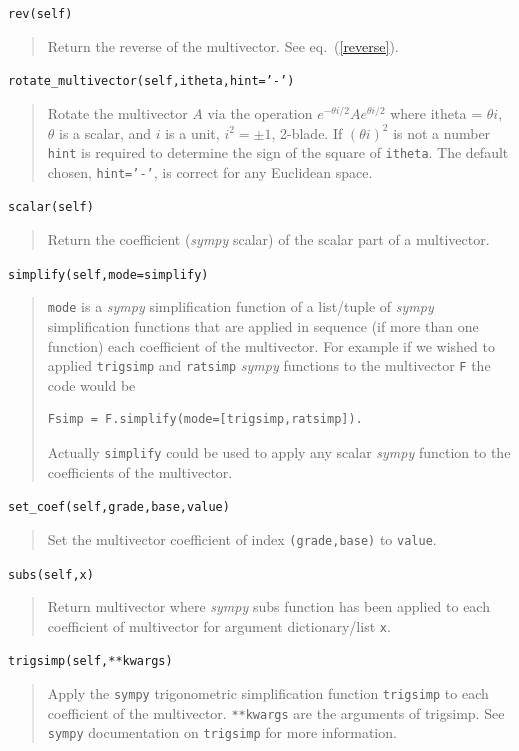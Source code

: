 \documentclass[12pt]{report}
\newcommand{\lp}{\left (}
\newcommand{\rp}{\right )}
\newcommand{\paren}[1]{\lp {#1} \rp}
\newcommand{\T}[1]{\texttt{#1}}
\begin{document}
\T{rev(self)}
\begin{quote}
   Return the reverse of the multivector.  See eq.~(\ref{reverse}).
\end{quote}

\T{rotate\_multivector(self,itheta,hint='-')}
\begin{quote}
    Rotate the multivector $A$ via the operation $e^{-\theta i/2}Ae^{\theta i/2}$
    where itheta = $\theta i$, $\theta$ is a scalar, and $i$ is a unit, $i^{2} = \pm 1$, 2-blade.
    If $\paren{\theta i}^{2}$ is not a number \T{hint} is required to determine the sign of the
    square of \T{itheta}.  The default chosen, \T{hint='-'}, is correct for any Euclidean space.
\end{quote}

\T{scalar(self)}
\begin{quote}
    Return the coefficient (\emph{sympy} scalar) of the scalar part of a
    multivector.
\end{quote}

\T{simplify(self,mode=simplify)}
\begin{quote}
   \T{mode} is a \emph{sympy} simplification function of a list/tuple of \emph{sympy}
   simplification functions that are applied in sequence (if more than
   one function) each coefficient of the multivector.  For example if
   we wished to applied \T{trigsimp} and \T{ratsimp} \emph{sympy} functions to the
   multivector \T{F} the code would be
   \begin{lstlisting}[numbers=none]
   Fsimp = F.simplify(mode=[trigsimp,ratsimp]).
   \end{lstlisting}
   \vspace{-10pt}
   Actually \T{simplify} could be used to apply any scalar \emph{sympy} function to
   the coefficients of the multivector.
\end{quote}

\T{set\_coef(self,grade,base,value)}
\begin{quote}
   Set the multivector coefficient of index \T{(grade,base)} to \T{value}.
\end{quote}

\T{subs(self,x)}
\begin{quote}
   Return multivector where \emph{sympy} subs function has been applied to each
   coefficient of multivector for argument dictionary/list \T{x}.
\end{quote}

\T{trigsimp(self,**kwargs)}
\begin{quote}
   Apply the \T{sympy} trigonometric simplification function \T{trigsimp} to
   each coefficient of the multivector. \T{**kwargs} are the arguments of
   trigsimp.  See \T{sympy} documentation on \T{trigsimp} for more information.
\end{quote}
\end{document}
